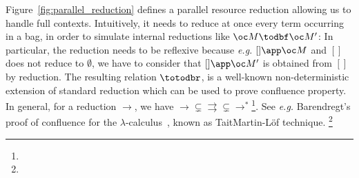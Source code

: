 Figure~\ref{fig:parallel_reduction} defines a parallel resource reduction allowing us to handle full contexts. Intuitively, it needs to
reduce at once every term occurring in a bag, in order to simulate internal 
reductions like $\oc M\todbf \oc M'$:  In particular, the reduction needs to be reflexive
because \emph{e.g.}
$[]\app \oc M$ and $[]$ does not reduce to $\emptyset$, we have to consider that $[]\app
\oc M'$ is obtained from $[]$ by reduction. The resulting relation $\totodbr$, is a
well-known non-deterministic extension of standard reduction which can be used
to prove confluence property. In general, for a reduction $\to$, we have
$\to\subsetneq\rightrightarrows\subsetneq\to^*$\footnote{
}. See \emph{e.g.} Barendregt's proof of confluence
for the $\lambda$-calculus~\cite{barendregt}, known as Tait\nativeemdash{}Martin-Löf technique.
\footnote{}
%
